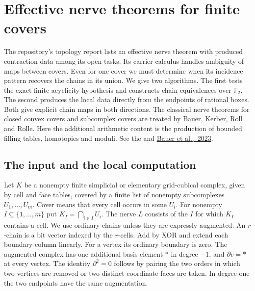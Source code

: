 \section{Effective nerve theorems for finite covers}
\label{sec:nerve-case}

The repository's topology report lists an effective nerve theorem with
produced contraction data among its open tasks. Its carrier calculus handles
ambiguity of maps between covers. Even for one cover we must determine when its incidence pattern recovers the chains in its union. We give two algorithms. The first
tests the exact finite acyclicity hypothesis and constructs chain equivalences
over $\mathbb F_2$. The second produces the local data directly from the
endpoints of rational boxes. Both give explicit chain maps in both directions.
The classical nerve theorems for closed convex covers and subcomplex covers
are treated by Bauer, Kerber, Roll and Rolle. Here the additional arithmetic
content is the production of bounded filling tables, homotopies and
moduli. See the
and \href{https://arxiv.org/abs/2203.03571}{Bauer et al.,\ 2023}.

\subsection{The input and the local computation}

Let $K$ be a nonempty finite simplicial or elementary grid-cubical complex,
given by cell and face tables, covered by a finite list of nonempty
subcomplexes $U_1,\ldots,U_m$. Cover means that every cell occurs in some
$U_i$. For nonempty $I\subseteq\{1,\ldots,m\}$ put
$K_I=\bigcap_{i\in I} U_i$. The nerve $L$ consists of the $I$ for which
$K_I$ contains a cell. We use ordinary chains unless they are expressly
augmented. An $r$-chain is a bit vector indexed by the $r$-cells. Add by XOR
and extend each boundary column linearly. For a vertex its ordinary boundary
is zero. The augmented complex has one additional basis element $*$ in
degree $-1$, and $\partial v=*$ at every vertex. The identity
$\partial^2=0$ follows by pairing the two orders in which two
vertices are removed or two distinct coordinate faces are taken. In degree
one the two endpoints have the same augmentation.

